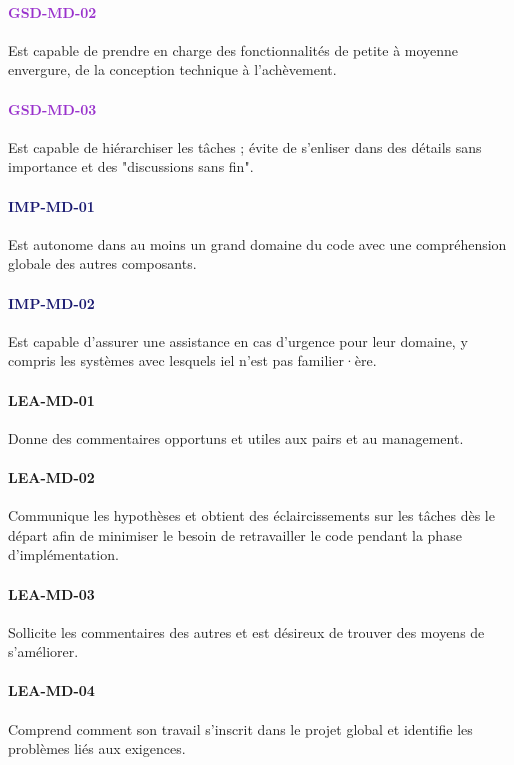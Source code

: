 \documentclass[a4paper, french, openany, 12pt]{book}
\newcommand\str[1]{\textcolor{DarkOrchid}{\textbf{\uppercase{gsd-{#1}}}}}
\newcommand\wis[1]{\textcolor{MidnightBlue}{\textbf{\uppercase{imp-{#1}}}}}
\newcommand\cha[1]{\textcolor{OliveGreen}{\textbf{\uppercase{lea-{#1}}}}}
\begin{document}
\begin{multicols}{2}
  \paragraph*{\str{md-02}}

  Est capable de prendre en charge des fonctionnalités de petite à moyenne envergure, de la conception technique à
  l'achèvement.

  \paragraph*{\str{md-03}}

  Est capable de hiérarchiser les tâches ; évite de s'enliser dans des détails sans importance et des "discussions sans
  fin".

  \paragraph*{\wis{md-01}}

  Est autonome dans au moins un grand domaine du code avec une compréhension globale des autres composants.

  \paragraph*{\wis{md-02}}

  Est capable d'assurer une assistance en cas d'urgence pour leur domaine, y compris les systèmes avec lesquels iel
  n'est pas familier·ère.

  \paragraph*{\cha{md-01}}

  Donne des commentaires opportuns et utiles aux pairs et au management.

  \paragraph*{\cha{md-02}}

  Communique les hypothèses et obtient des éclaircissements sur les tâches dès le départ afin de minimiser le besoin de
  retravailler le code pendant la phase d'implémentation.

  \paragraph*{\cha{md-03}}

  Sollicite les commentaires des autres et est désireux de trouver des moyens de s'améliorer.

  \paragraph*{\cha{md-04}}

  Comprend comment son travail s'inscrit dans le projet global et identifie les problèmes liés aux exigences.

\end{multicols}
\end{document}
